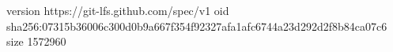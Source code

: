 version https://git-lfs.github.com/spec/v1
oid sha256:07315b36006c300d0b9a667f354f92327afa1afc6744a23d292d2f8b84ca07c6
size 1572960
